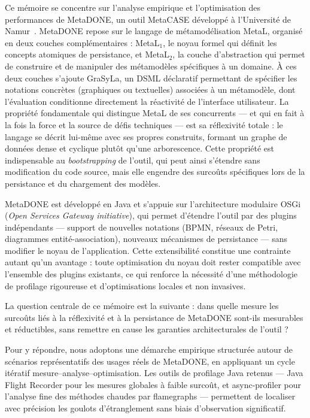 Ce mémoire se concentre sur l'analyse empirique et l'optimisation des performances de MetaDONE, un outil MetaCASE développé à l'Université de Namur~\cite{Eng2007}. MetaDONE repose sur le langage de métamodélisation MetaL, organisé en deux couches complémentaires : MetaL$_1$, le noyau formel qui définit les concepts atomiques de persistance, et MetaL$_2$, la couche d'abstraction qui permet de construire et de manipuler des métamodèles spécifiques à un domaine. À ces deux couches s'ajoute GraSyLa, un DSML déclaratif permettant de spécifier les notations concrètes (graphiques ou textuelles) associées à un métamodèle, dont l'évaluation conditionne directement la réactivité de l'interface utilisateur. La propriété fondamentale qui distingue MetaL de ses concurrents — et qui en fait à la fois la force et la source de défis techniques — est sa réflexivité totale : le langage se décrit lui-même avec ses propres construits, formant un graphe de données dense et cyclique plutôt qu'une arborescence. Cette propriété est indispensable au \textit{bootstrapping} de l'outil, qui peut ainsi s'étendre sans modification du code source, mais elle engendre des surcoûts spécifiques lors de la persistance et du chargement des modèles.

MetaDONE est développé en Java et s'appuie sur l'architecture modulaire OSGi (\textit{Open Services Gateway initiative}), qui permet d'étendre l'outil par des plugins indépendants — support de nouvelles notations (BPMN, réseaux de Petri, diagrammes entité-association), nouveaux mécanismes de persistance — sans modifier le noyau de l'application. Cette extensibilité constitue une contrainte autant qu'un avantage : toute optimisation du noyau doit rester compatible avec l'ensemble des plugins existants, ce qui renforce la nécessité d'une méthodologie de profilage rigoureuse et d'optimisations locales et non invasives.

La question centrale de ce mémoire est la suivante : dans quelle mesure les surcoûts liés à la réflexivité et à la persistance de MetaDONE sont-ils mesurables et réductibles, sans remettre en cause les garanties architecturales de l'outil ?

Pour y répondre, nous adoptons une démarche empirique structurée autour de scénarios représentatifs des usages réels de MetaDONE, en appliquant un cycle itératif mesure--analyse--optimisation. Les outils de profilage Java retenus --- Java Flight Recorder pour les mesures globales à faible surcoût, et async-profiler pour l'analyse fine des méthodes chaudes par flamegraphs --- permettent de localiser avec précision les goulots d'étranglement sans biais d'observation significatif.

